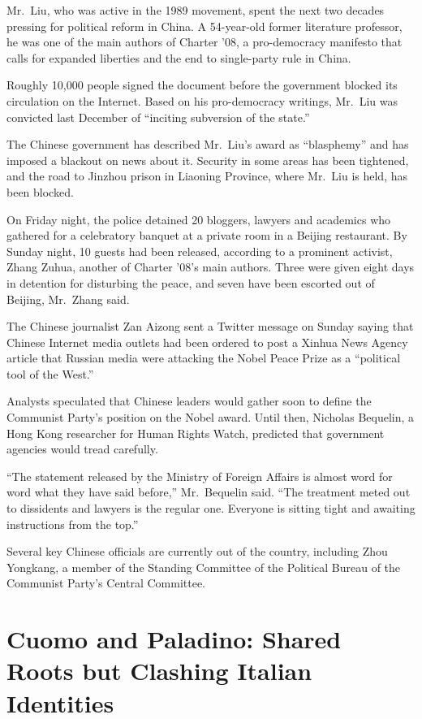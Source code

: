 ﻿\documentclass[12pt]{article}
\begin{document}
Mr.~Liu, who was active in the 1989 movement, spent the next two decades pressing for political
reform in China. A 54-year-old former literature professor, he was one of the main authors of
Charter '08, a pro-democracy manifesto that calls for expanded liberties and the end to single-party
rule in China.

Roughly 10,000 people signed the document before the government blocked its circulation on the
Internet. Based on his pro-democracy writings, Mr.~Liu was convicted last December of ``inciting
subversion of the state.''

The Chinese government has described Mr.~Liu's award as ``blasphemy'' and has imposed a blackout on
news about it. Security in some areas has been tightened, and the road to Jinzhou prison in Liaoning
Province, where Mr.~Liu is held, has been blocked.

On Friday night, the police detained 20 bloggers, lawyers and academics who gathered for a
celebratory banquet at a private room in a Beijing restaurant. By Sunday night, 10 guests had been
released, according to a prominent activist, Zhang Zuhua, another of Charter '08's main authors.
Three were given eight days in detention for disturbing the peace, and seven have been escorted out
of Beijing, Mr.~Zhang said.

The Chinese journalist Zan Aizong sent a Twitter message on Sunday saying that Chinese Internet
media outlets had been ordered to post a Xinhua News Agency article that Russian media were
attacking the Nobel Peace Prize as a ``political tool of the West.''

Analysts speculated that Chinese leaders would gather soon to define the Communist Party's position
on the Nobel award. Until then, Nicholas Bequelin, a Hong Kong researcher for Human Rights Watch,
predicted that government agencies would tread carefully.

``The statement released by the Ministry of Foreign Affairs is almost word for word what they have
said before,'' Mr.~Bequelin said. ``The treatment meted out to dissidents and lawyers is the regular
one. Everyone is sitting tight and awaiting instructions from the top.''

Several key Chinese officials are currently out of the country, including Zhou Yongkang, a member of
the Standing Committee of the Political Bureau of the Communist Party's Central Committee.

\section{Cuomo and Paladino: Shared Roots but Clashing Italian Identities}
\end{document}
